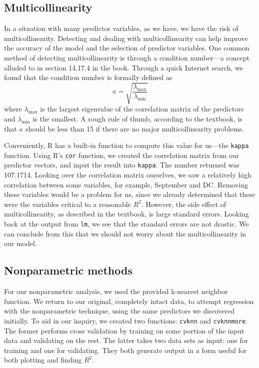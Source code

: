 \documentclass{article}
\begin{document}

\subsection{Multicollinearity}

In a situation with many predictor variables, as we have, we have the risk of
multicollinearity. Detecting and dealing with multicollinearity can help
improve the accuracy of the model and the selection of predictor variables. One
common method of detecting multicollinearity is through a condition number---a
concept alluded to in section 14.17.4 in the book. Through a quick Internet
search, we found that the condition number is formally defined as
\begin{equation*}
    \kappa = \sqrt{ \frac{ \lambda_{\text{max}}}{\lambda_{\text{min}}}}
\end{equation*}
where $\lambda_{\text{max}}$ is the largest eigenvalue of the correlation
matrix of the predictors and $\lambda_{\text{min}}$ is the smallest. A rough
rule of thumb, according to the textbook, is that $\kappa$ should be less than
15 if there are no major multicollinearity problems.

Conveniently, R has a built-in function to compute this value for us---the
\verb=kappa= function. Using R's \verb=cor= function, we created the
correlation matrix from our predictor vectors, and input the result into
\verb=kappa=. The number returned was 107.1714. Looking over the correlation
matrix ourselves, we saw a relatively high correlation between some variables,
for example, September and DC. Removing these variables would be a problem for
us, since we already determined that these were the variables critical to a
reasonable $R^2$. However, the side effect of multicollinearity, as described
in the textbook, is large standard errors. Looking back at the output from
\verb=lm=, we see that the standard errors are not drastic. We can conclude
from this that we should not worry about the multicollinearity in our model.


\subsection{Nonparametric methods}

For our nonparametric analysis, we used the provided k-nearest neighbor
function. We return to our original, completely intact data, to attempt
regression with the nonparametric technique, using the same predictors we
discovered initially. To aid in our inquiry, we created two functions:
\verb=cvknn= and \verb=cvknnmore=. The former performs cross validation by
training on some portion of the input data and validating on the rest. The
latter takes two data sets as input: one for training and one for validating.
They both generate output in a form useful for both plotting and finding $R^2$.
\end{document}
